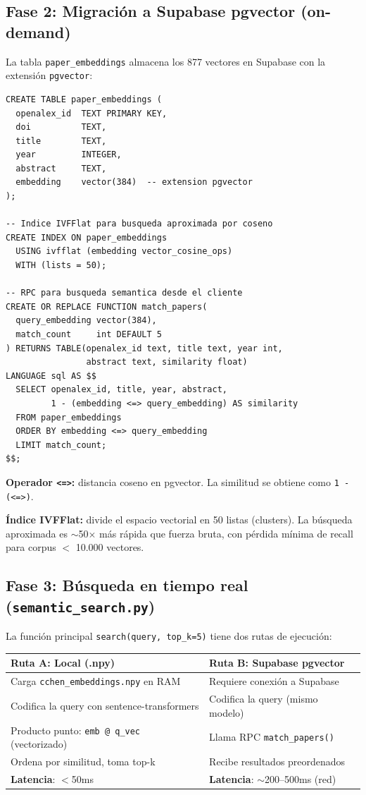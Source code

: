 \documentclass[12pt,a4paper]{report}
\begin{document}
\subsection*{Fase 2: Migración a Supabase pgvector (on-demand)}

La tabla \texttt{paper\_embeddings} almacena los 877 vectores en Supabase con la extensión \texttt{pgvector}:

\begin{lstlisting}[style=sqlstyle, caption={Definición de la tabla paper\_embeddings}]
CREATE TABLE paper_embeddings (
  openalex_id  TEXT PRIMARY KEY,
  doi          TEXT,
  title        TEXT,
  year         INTEGER,
  abstract     TEXT,
  embedding    vector(384)  -- extension pgvector
);

-- Indice IVFFlat para busqueda aproximada por coseno
CREATE INDEX ON paper_embeddings
  USING ivfflat (embedding vector_cosine_ops)
  WITH (lists = 50);

-- RPC para busqueda semantica desde el cliente
CREATE OR REPLACE FUNCTION match_papers(
  query_embedding vector(384),
  match_count     int DEFAULT 5
) RETURNS TABLE(openalex_id text, title text, year int,
                abstract text, similarity float)
LANGUAGE sql AS $$
  SELECT openalex_id, title, year, abstract,
         1 - (embedding <=> query_embedding) AS similarity
  FROM paper_embeddings
  ORDER BY embedding <=> query_embedding
  LIMIT match_count;
$$;
\end{lstlisting}

\textbf{Operador \texttt{<=>}:} distancia coseno en pgvector. La similitud se obtiene como \texttt{1 - (<=>)}.

\textbf{Índice IVFFlat:} divide el espacio vectorial en 50 listas (clusters). La búsqueda aproximada es $\sim$50$\times$ más rápida que fuerza bruta, con pérdida mínima de recall para corpus $<$ 10.000 vectores.

\subsection*{Fase 3: Búsqueda en tiempo real (\texttt{semantic\_search.py})}

La función principal \texttt{search(query, top\_k=5)} tiene dos rutas de ejecución:

\begin{center}
\begin{tabular}{L{6.5cm}L{6.5cm}}
  \toprule
  \textbf{Ruta A: Local (.npy)} & \textbf{Ruta B: Supabase pgvector} \\
  \midrule
  Carga \texttt{cchen\_embeddings.npy} en RAM & Requiere conexión a Supabase \\
  Codifica la query con sentence-transformers & Codifica la query (mismo modelo) \\
  Producto punto: \texttt{emb @ q\_vec} (vectorizado) & Llama RPC \texttt{match\_papers()} \\
  Ordena por similitud, toma top-k & Recibe resultados preordenados \\
  \textbf{Latencia}: $<$50ms & \textbf{Latencia}: $\sim$200--500ms (red) \\
  \bottomrule
\end{tabular}
\end{center}
\end{document}
